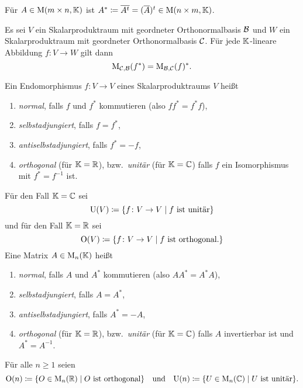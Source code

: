 \begin{definition}
  Für $A \in \mathrm{M}(m \times n, \mathbb{K})$ ist $A^* \coloneqq \overline{A^t} = (\overline{A})^t \in \mathrm{M}(n \times m, \mathbb{K})$.
\end{definition}


\begin{proposition}
  Es sei $V$ ein Skalarproduktraum mit geordneter Orthonormalbasis $\mathcal{B}$ und $W$ ein Skalarproduktraum mit geordneter Orthonormalbasis $\mathcal{C}$.
  Für jede $\mathbb{K}$-lineare Abbildung $f \colon V \to W$ gilt dann
  \[
    \mathrm{M}_{\mathcal{C}, \mathcal{B}}(f^*) = \mathrm{M}_{\mathcal{B}, \mathcal{C}}(f)^*.
  \]
\end{proposition}


\begin{definition}
  Ein Endomorphismus $f \colon V \to V$ eines Skalarproduktraums $V$ heißt
  \begin{enumerate}[leftmargin=*, label=\roman*)]
    \item
      \emph{normal}, falls $f$ und $f^*$ kommutieren (also $f f^* = f^* f$),
    \item
      \emph{selbstadjungiert}, falls $f = f^*$,
    \item
      \emph{antiselbstadjungiert}, falls $f^* = -f$,
    \item
      \emph{orthogonal} (für $\mathbb{K} = \mathbb{R}$), bzw.\ \emph{unitär} (für $\mathbb{K} = \mathbb{C}$) falls $f$ ein Isomorphismus mit $f^* = f^{-1}$ ist.
  \end{enumerate}
  Für den Fall $\mathbb{K} = \mathbb{C}$ sei
  \[
    \mathrm{U}(V)
    \coloneqq
    \{
      f \colon V \to V
      \mid
      \text{$f$ ist unitär}
    \}
  \]
  und für den Fall $\mathbb{K} = \mathbb{R}$ sei
  \[
    \mathrm{O}(V)
    \coloneqq
    \{
      f \colon V \to V
      \mid
      \text{$f$ ist orthogonal}.
    \}
  \]
  Eine Matrix $A \in \mathrm{M}_n(\mathbb{K})$ heißt
  \begin{enumerate}[leftmargin=*, label=\Roman*)]
    \item
      \emph{normal}, falls $A$ und $A^*$ kommutieren (also $A A^* = A^* A$),
    \item
      \emph{selbstadjungiert}, falls $A = A^*$,
    \item
      \emph{antiselbstadjungiert}, falls $A^* = -A$,
    \item
      \emph{orthogonal} (für $\mathbb{K} = \mathbb{R}$), bzw.\ \emph{unitär} (für $\mathbb{K} = \mathbb{C}$) falls $A$ invertierbar ist und $A^* = A^{-1}$.
  \end{enumerate}
  Für alle $n \geq 1$ seien
  \[
    \mathrm{O}(n)
    \coloneqq
    \{
      O \in \mathrm{M}_n(\mathbb{R})
      \mid
      \text{$O$ ist orthogonal}
    \}
    \quad\text{und}\quad
    \mathrm{U}(n)
    \coloneqq
    \{
      U \in \mathrm{M}_n(\mathbb{C})
      \mid
      \text{$U$ ist unitär}
    \}.
  \]
\end{definition}


